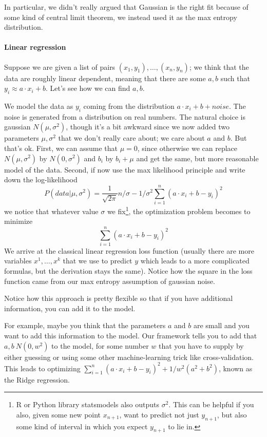 \documentclass{article}
\begin{document}
In particular, we didn't really argued that Gaussian is the right fit because of some kind of central limit theorem, we instead used it as the max entropy distribution. 

\paragraph{Linear regression}
Suppose we are given a list of pairs $(x_1, y_1), \dots, (x_n, y_n)$; we think that the data are roughly linear dependent, meaning that there are some $a,b$ such that $y_i \approx a\cdot x_i + b$. Let's see how we can find $a,b$. 

We model the data as $y_i$ coming from the distribution $a\cdot x_i + b+ noise$. The noise is generated from a distribution on real numbers. The natural choice is gaussian $N(\mu, \sigma^2)$, though it's a bit awkward since we now added two parameters $\mu, \sigma^2$ that we don't really care about; we care about $a$ and $b$. 
But that's ok. First, we can assume that $\mu = 0$, since otherwise we can replace $N(\mu, \sigma^2)$ by $N(0, \sigma^2)$ and $b_i$ by $b_i + \mu$ and get the same, but more reasonable model of the data. Second, if now use the max likelihood principle and write down the log-likelihood
\[
P(data | \mu, \sigma^2) = \frac{1}{\sqrt{2\pi}} n/\sigma - 1/\sigma^2 \sum_{i=1}^n (a\cdot x_i + b - y_i)^2 
\]
we notice that whatever value $\sigma$ we fix\footnote{R or Python library statsmodels also outputs $\sigma^2$. This can be helpful if you also, given some new point $x_{n+1}$, want to predict not just $y_{n+1}$, but also some kind of interval in which you expect $y_{n+1}$ to lie in. }, the optimization problem becomes to minimize
\[
\sum_{i=1}^n (a\cdot x_i + b - y_i)^2 
\]
We arrive at the classical linear regression loss function (usually there are more variables $x^1, \dots, x^k$ that we use to predict $y$ which leads to a more complicated formulas, but the derivation stays the same). Notice how the square in the loss function came from our max entropy assumption of gaussian noise. 

Notice how this approach is pretty flexible so that if you have additional information, you can add it to the model. 

For example, maybe you think that the parameters $a$ and $b$ are small and you want to add this information to the model. Our framework tells you to add that $a,b ~ N(0, w^2)$ to the model, for some number $w$ that you have to supply by either guessing or using some other machine-learning trick like cross-validation. This leads to optimizing $\sum_{i=1}^n (a\cdot x_i + b - y_i)^2 + 1/w^2(a^2 + b^2)$, known as the Ridge regression. 
\end{document}
